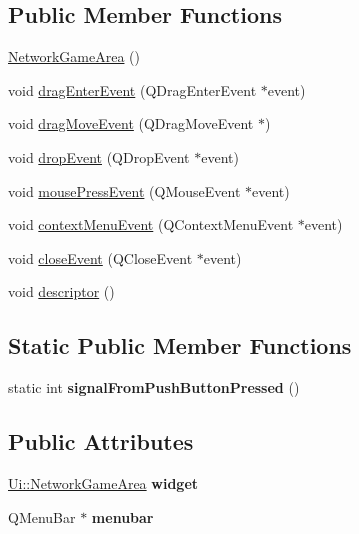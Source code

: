 \subsection*{Public Member Functions}
\begin{DoxyCompactItemize}
\item 
\hyperlink{class_network_game_area_ad632ca7082cf67f74a85db17cc649cc9}{Network\-Game\-Area} ()
\item 
void \hyperlink{class_network_game_area_aa7e2b56c24d703187ba6db3e3dc9f953}{drag\-Enter\-Event} (Q\-Drag\-Enter\-Event $\ast$event)
\item 
void \hyperlink{class_network_game_area_a91f9e0d6c549b5994c484cd32ae593b5}{drag\-Move\-Event} (Q\-Drag\-Move\-Event $\ast$)
\item 
void \hyperlink{class_network_game_area_a85864a3aeeef08d677d2b1c53d39ef95}{drop\-Event} (Q\-Drop\-Event $\ast$event)
\item 
void \hyperlink{class_network_game_area_ac2b24b255842e36d66419b99fec55f99}{mouse\-Press\-Event} (Q\-Mouse\-Event $\ast$event)
\item 
void \hyperlink{class_network_game_area_addcd60218b7a45da923e7cf0b4226476}{context\-Menu\-Event} (Q\-Context\-Menu\-Event $\ast$event)
\item 
void \hyperlink{class_network_game_area_ac597f63d4265fe36ec5a84e43d2879e7}{close\-Event} (Q\-Close\-Event $\ast$event)
\item 
void \hyperlink{class_network_game_area_a39a34c3f6606887d3fc313e21bbf693f}{descriptor} ()
\end{DoxyCompactItemize}
\subsection*{Static Public Member Functions}
\begin{DoxyCompactItemize}
\item 
\hypertarget{class_network_game_area_aaac4134f2f1318032446f48ddcaeadd1}{static int {\bfseries signal\-From\-Push\-Button\-Pressed} ()}\label{class_network_game_area_aaac4134f2f1318032446f48ddcaeadd1}

\end{DoxyCompactItemize}
\subsection*{Public Attributes}
\begin{DoxyCompactItemize}
\item 
\hypertarget{class_network_game_area_a92ac0010a5e207ec5c5136718e9549a3}{\hyperlink{class_ui_1_1_network_game_area}{Ui\-::\-Network\-Game\-Area} {\bfseries widget}}\label{class_network_game_area_a92ac0010a5e207ec5c5136718e9549a3}

\item 
\hypertarget{class_network_game_area_a0cf8d5148a003876970be165fc97de0a}{Q\-Menu\-Bar $\ast$ {\bfseries menubar}}\label{class_network_game_area_a0cf8d5148a003876970be165fc97de0a}

\end{DoxyCompactItemize}


